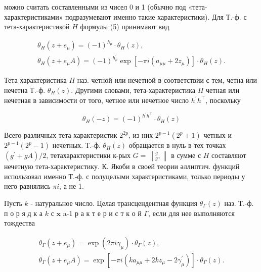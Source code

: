 \documentclass[10pt]{article}
\begin{document}
можно считать составленными из чисел 0 и 1 (обычно под «тета-характеристиками» подразумевают именно такие характеристики). Для Т.-ф. с тета-характеристикой $H$ формулы (5) принимают вид



\[

\begin{gathered}

\theta_{H}\left(z+e_{\mu}\right)=(-1)^{h_{\mu}} \cdot \theta_{H}(z), \\

\theta_{H}\left(z+e_{\mu} A\right)=(-1)^{h_{\mu}^{\prime}} \exp \left[-\pi i\left(a_{\mu \mu}+2 z_{\mu}\right)\right] \cdot \theta_{H}(z) .

\end{gathered}

\]



Тета-характеристика $H$ наз. четной или нечетной в соответствии с тем, четна или нечетна Т.-ф. $\theta_{H}(z)$. Другими словами, тета-характеристика $H$ четная или нечетная в зависимости от того, четное или нечетное число $h^{\prime} h^{\top}$, поскольку



\[

\theta_{H}(-z)=(-1)^{h^{\prime} h^{\top}} \cdot \theta_{H}(z)

\]



Всего различных тета-характеристик $2^{2 p}$, из них $2^{p-1}\left(2^{p}+1\right)$ четных и $2^{p-1}\left(2^{p}-1\right)$ нечетных. Т.-ф. $\theta_{H}(z)$ обращается в нуль в тех точках $\left(g^{\prime}+g A\right) / 2$, тетахарактеристики к-рых $G=\left\|_{g}^{g},\right\|$ в сумме с $H$ составляют нечетную тета-характеристику. К. Якоби в своей теории әллиптич. функций использовал именно Т.-ф. с полуцелыми характеристиками, только периоды у него равнялись $\pi i$, а не 1.



Пусть $k$ - натуральное число. Целая трансцендентная функция $\theta_{\Gamma}(z)$ наз. Т.-ф. п о р я д к а $k$ с $\mathbf{x}$ a-1 р а к т е р и с т к о й $\Gamma$, если для нее выполняются тождества



\[

\begin{gathered}

\theta_{\Gamma}\left(z+e_{\mu}\right)=\exp \left(2 \pi i \gamma_{\mu}\right) \cdot \theta_{\Gamma}(z), \\

\theta_{\Gamma}\left(z+e_{\mu} A\right)=\exp \left[-\pi i\left(k a_{\mu \mu}+2 k z_{\mu}-2 \gamma_{\mu}^{\prime}\right)\right] \cdot \theta_{\Gamma}(z) .

\end{gathered}

\]
\end{document}
